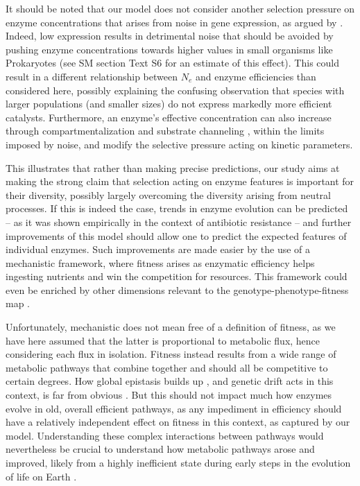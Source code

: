 \documentclass[nogrid,crop,final]{MBE2}%
\begin{document}
It should be noted that our model does not consider another selection pressure on enzyme concentrations that arises from noise in gene expression, as argued by \citet{Wang11}. Indeed, low expression results in detrimental noise that should be avoided by pushing enzyme concentrations towards higher values in small organisms like Prokaryotes (see SM section Text S6 for an estimate of this effect). This could result in a different relationship between $N_e$ and enzyme efficiencies than considered here, possibly explaining the confusing observation that species with larger populations (and smaller sizes) do not express markedly more efficient catalysts. Furthermore, an enzyme's effective concentration can also increase through compartmentalization \citep{Ovadi04,Diekmann13,Cornejo14} and substrate channeling \citep{Welch94,Huang01,Sweetlove18}, within the limits imposed by noise, and modify the selective pressure acting on kinetic parameters.

This illustrates that rather than making precise predictions, our study aims at making the strong claim that selection acting on enzyme features is important for their diversity, possibly largely overcoming the diversity arising from neutral processes. If this is indeed the case, trends in enzyme evolution can be predicted -- as it was shown empirically in the context of antibiotic resistance \citep{Walkiewicz12} -- and further improvements of this model should allow one to predict the expected features of individual enzymes. Such improvements are made easier by the use of a mechanistic framework, where fitness arises as enzymatic efficiency helps ingesting nutrients and win the competition for resources. This framework could even be enriched by other dimensions relevant to the genotype-phenotype-fitness map \citep{Bershtein17,Echave19,Kinsler20}. 

Unfortunately, mechanistic does not mean free of a definition of fitness, as we have here assumed that the latter is proportional to metabolic flux, hence considering each flux in isolation. Fitness instead results from a wide range of metabolic pathways that combine together and should all be competitive to certain degrees. How global epistasis builds up \citep{Weinreich13,Otwinowski18,Reddy20}, and genetic drift acts in this context, is far from obvious \citep{Iwasa04,Weinreich05,Weissman09}. But this should not impact much how enzymes evolve in old, overall efficient pathways, as any impediment in efficiency should have a relatively independent effect on fitness in this context, as captured by our model. Understanding these complex interactions between pathways would nevertheless be crucial to understand how metabolic pathways arose and improved, likely from a highly inefficient state during early steps in the evolution of life on Earth \citep{Kacser84,Schmidt03,Heckmann18}.
\end{document}
